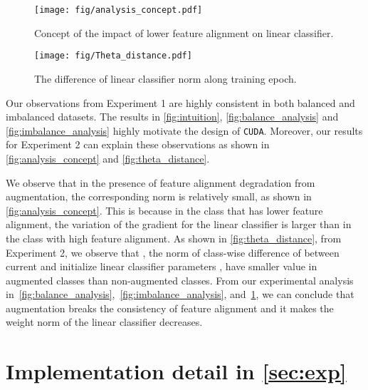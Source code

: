 \documentclass{article}
\def\code#1{\texttt{#1}}
\newcommand{\alg}{\code{CUDA}\xspace}
\begin{document}
\begin{figure}[th]
  \centering
  \begin{minipage}{.49\textwidth}
    \centering
        \texttt{[image: fig/analysis\_concept.pdf]}
        \vspace{1pt}
        \caption{Concept of the impact of lower feature alignment on linear classifier.}
        \label{fig:analysis_concept}
    \end{minipage}\hfill
    \begin{minipage}{.49\textwidth}
    \centering
        \texttt{[image: fig/Theta\_distance.pdf]}
        \caption{The difference of linear classifier norm  along training epoch.}
        \label{fig:theta_distance}
    \end{minipage}
\end{figure}

Our observations from Experiment 1 are highly consistent in both balanced and imbalanced datasets. The results in \autoref{fig:intuition}, \autoref{fig:balance_analysis} and \autoref{fig:imbalance_analysis} highly motivate the design of \alg. Moreover, our results for Experiment 2 can explain these observations as shown in \autoref{fig:analysis_concept} and \autoref{fig:theta_distance}.

We observe that in the presence of feature alignment degradation from augmentation, the corresponding norm is relatively small, as shown in \autoref{fig:analysis_concept}. This is because in the class that has lower feature alignment, the variation of the gradient for the linear classifier is larger than in the class with high feature alignment. As shown in \autoref{fig:theta_distance}, from Experiment 2, we observe that , the norm of class-wise difference of between current and initialize linear classifier parameters  , have smaller value in augmented classes than non-augmented classes. From our experimental analysis in~\autoref{fig:balance_analysis},~\ref{fig:imbalance_analysis}, and~\ref{fig:theta_distance}, we can conclude that augmentation breaks the consistency of feature alignment and it makes the weight norm of the linear classifier decreases.









%
 
\section{Implementation detail in \autoref{sec:exp}}
\label{app:implementation}
\end{document}
